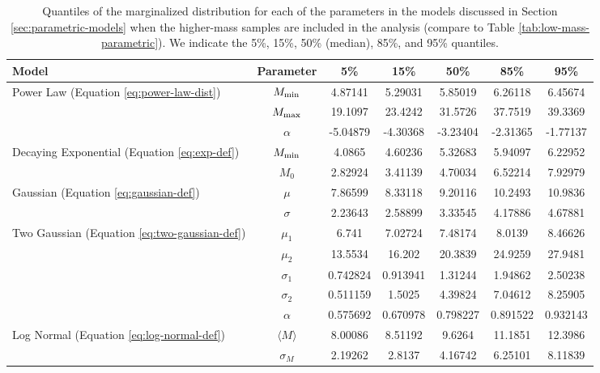 \documentclass[preprint]{aastex}
\newcommand{\Mmin}{M_{\textnormal{min}}}
\newcommand{\Mmax}{M_{\textnormal{max}}}
\begin{document}
\begin{table}
  \begin{center}
    \begin{tabular}{|l|c|c|c|c|c|c|}
      \hline
      Model & Parameter & 5\% & 15\% & 50\% & 85\% & 95\% \\
      \hline \hline
      Power Law (Equation \eqref{eq:power-law-dist}) & $\Mmin$ & 
      4.87141 & 5.29031 & 5.85019 & 6.26118 & 6.45674 \\
      \hline
      & $\Mmax$ & 19.1097 & 23.4242 & 31.5726 & 37.7519 & 39.3369 \\
      \hline
      & $\alpha$ & -5.04879 & -4.30368 & -3.23404 & -2.31365 & -1.77137 \\
      \hline \hline
      Decaying Exponential (Equation \eqref{eq:exp-def}) & $\Mmin$ & 
      4.0865 & 4.60236 & 5.32683 & 5.94097 & 6.22952 \\
      \hline
      & $M_0$ & 2.82924 & 3.41139 & 4.70034 & 6.52214 & 7.92979 \\
      \hline \hline
      Gaussian (Equation \eqref{eq:gaussian-def}) & $\mu$ & 
      7.86599 & 8.33118 & 9.20116 & 10.2493 & 10.9836 \\
      \hline
      & $\sigma$ & 2.23643 & 2.58899 & 3.33545 & 4.17886 & 4.67881 \\
      \hline \hline
      Two Gaussian (Equation \eqref{eq:two-gaussian-def}) & $\mu_1$ & 
      6.741 & 7.02724 & 7.48174 & 8.0139 & 8.46626 \\
      \hline
      & $\mu_2$ & 13.5534 & 16.202 & 20.3839 & 24.9259 & 27.9481 \\
      \hline
      & $\sigma_1$ & 0.742824 & 0.913941 & 1.31244 & 1.94862 & 2.50238 \\
      \hline
      & $\sigma_2$ & 0.511159 & 1.5025 & 4.39824 & 7.04612 & 8.25905 \\
      \hline
      & $\alpha$ & 0.575692 & 0.670978 & 0.798227 & 0.891522 & 0.932143 \\
      \hline \hline
      Log Normal (Equation \eqref{eq:log-normal-def}) & $\langle M \rangle$ & 
      8.00086 & 8.51192 & 9.6264 & 11.1851 & 12.3986 \\
      \hline
      & $\sigma_M$ & 2.19262 & 2.8137 & 4.16742 & 6.25101 & 8.11839 \\
      \hline
    \end{tabular}
  \end{center}
  \caption{\label{tab:high-mass-parametric} Quantiles of the
    marginalized distribution for each of the parameters in the models
    discussed in Section \ref{sec:parametric-models} when the
    higher-mass samples are included in the analysis (compare to Table
    \ref{tab:low-mass-parametric}).  We indicate the 5\%, 15\%, 50\% (median), 85\%, and 95\% quantiles.}
\end{table}
\end{document}
